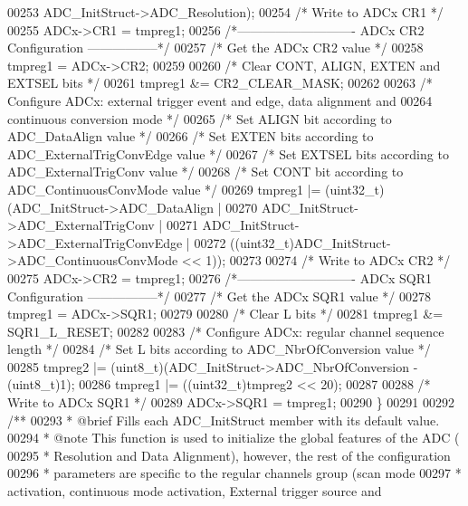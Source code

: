 \begin{DoxyCode}
00253                                    ADC\_InitStruct->ADC_Resolution);
00254   \textcolor{comment}{/* Write to ADCx CR1 */}
00255   ADCx->CR1 = tmpreg1;
00256   \textcolor{comment}{/*---------------------------- ADCx CR2 Configuration -----------------*/}
00257   \textcolor{comment}{/* Get the ADCx CR2 value */}
00258   tmpreg1 = ADCx->CR2;
00259 
00260   \textcolor{comment}{/* Clear CONT, ALIGN, EXTEN and EXTSEL bits */}
00261   tmpreg1 &= CR2_CLEAR_MASK;
00262 
00263   \textcolor{comment}{/* Configure ADCx: external trigger event and edge, data alignment and }
00264 \textcolor{comment}{     continuous conversion mode */}
00265   \textcolor{comment}{/* Set ALIGN bit according to ADC\_DataAlign value */}
00266   \textcolor{comment}{/* Set EXTEN bits according to ADC\_ExternalTrigConvEdge value */}
00267   \textcolor{comment}{/* Set EXTSEL bits according to ADC\_ExternalTrigConv value */}
00268   \textcolor{comment}{/* Set CONT bit according to ADC\_ContinuousConvMode value */}
00269   tmpreg1 |= (uint32\_t)(ADC\_InitStruct->ADC_DataAlign |
00270                         ADC\_InitStruct->ADC_ExternalTrigConv |
00271                         ADC\_InitStruct->ADC_ExternalTrigConvEdge |
00272                         ((uint32\_t)ADC\_InitStruct->ADC_ContinuousConvMode << 1));
00273 
00274   \textcolor{comment}{/* Write to ADCx CR2 */}
00275   ADCx->CR2 = tmpreg1;
00276   \textcolor{comment}{/*---------------------------- ADCx SQR1 Configuration -----------------*/}
00277   \textcolor{comment}{/* Get the ADCx SQR1 value */}
00278   tmpreg1 = ADCx->SQR1;
00279 
00280   \textcolor{comment}{/* Clear L bits */}
00281   tmpreg1 &= SQR1_L_RESET;
00282 
00283   \textcolor{comment}{/* Configure ADCx: regular channel sequence length */}
00284   \textcolor{comment}{/* Set L bits according to ADC\_NbrOfConversion value */}
00285   tmpreg2 |= (uint8\_t)(ADC\_InitStruct->ADC_NbrOfConversion - (uint8\_t)1);
00286   tmpreg1 |= ((uint32\_t)tmpreg2 << 20);
00287 
00288   \textcolor{comment}{/* Write to ADCx SQR1 */}
00289   ADCx->SQR1 = tmpreg1;
00290 \}
00291 
00292 \textcolor{comment}{/**}
00293 \textcolor{comment}{  * @brief  Fills each ADC\_InitStruct member with its default value.}
00294 \textcolor{comment}{  * @note   This function is used to initialize the global features of the ADC ( }
00295 \textcolor{comment}{  *         Resolution and Data Alignment), however, the rest of the configuration}
00296 \textcolor{comment}{  *         parameters are specific to the regular channels group (scan mode }
00297 \textcolor{comment}{  *         activation, continuous mode activation, External trigger source and }

\end{DoxyCode}
